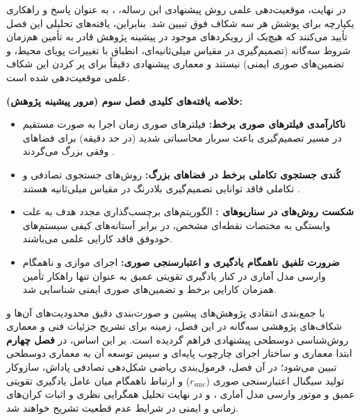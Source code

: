 \documentclass[oneside,openany,phd]{TMU-Thesis}
\begin{document}
در نهایت، موقعیت‌دهی علمی روش پیشنهادی این رساله، ، به عنوان پاسخ و راهکاری یکپارچه برای پوشش هر سه شکاف فوق تبیین شد. بنابراین، یافته‌های تحلیلی این فصل تأیید می‌کنند که هیچ‌یک از رویکردهای موجود در پیشینه پژوهش قادر به تأمین هم‌زمان شروط سه‌گانه (تصمیم‌گیری در مقیاس میلی‌ثانیه‌ای، انطباق با تغییرات پویای محیط، و تضمین‌های صوری ایمنی) نیستند و معماری پیشنهادی  دقیقاً برای پر کردن این شکاف علمی موقعیت‌دهی شده است.

\begin{framed}
\noindent\textbf{خلاصه یافته‌های کلیدی فصل سوم (مرور پیشینه پژوهش):}
\begin{itemize}
    \item \textbf{ناکارآمدی فیلترهای صوری برخط:} فیلترهای صوری زمان اجرا به صورت مستقیم در مسیر تصمیم‌گیری باعث سربار محاسباتی شدید (در حد دقیقه) برای فضاهای وفقی بزرگ می‌گردند \cite{camara2020quantitative, calinescu2011formal}.
    \item \textbf{کُندی جستجوی تکاملی برخط در فضاهای بزرگ:} روش‌های جستجوی تصادفی و تکاملی فاقد توانایی تصمیم‌گیری بلادرنگ در مقیاس میلی‌ثانیه هستند \cite{coker2015sass, kinneer2021information}.
    \item \textbf{شکست روش‌های  در سناریوهای :} الگوریتم‌های برچسب‌گذاری مجدد هدف به علت وابستگی به مختصات نقطه‌ای مشخص، در برابر آستانه‌های کیفی سیستم‌های خودوفق فاقد کارایی علمی می‌باشند.
    \item \textbf{ضرورت تلفیق ناهمگام یادگیری و اعتبارسنجی صوری:} اجرای موازی و ناهمگام وارسی مدل آماری  در کنار یادگیری تقویتی عمیق به عنوان تنها راهکار تأمین همزمان کارایی برخط و تضمین‌های صوری ایمنی شناسایی شد.
\end{itemize}
\end{framed}

با جمع‌بندی انتقادی پژوهش‌های پیشین و صورت‌بندی دقیق محدودیت‌های آن‌ها و شکاف‌های پژوهشی سه‌گانه در این فصل، زمینه برای تشریح جزئیات فنی و معماری روش‌شناسی دوسطحی پیشنهادی فراهم گردیده است. بر این اساس، در \textbf{فصل چهارم} ابتدا معماری و ساختار اجرای چارچوب پایه‌ای  و سپس توسعه آن به معماری دوسطحی \rsdrlplus تبیین می‌شود؛ در آن فصل، فرمول‌بندی ریاضی شکل‌دهی تصادفی پاداش، سازوکار تولید سیگنال اعتبارسنجی صوری ($r_{\text{smc}}$) و ارتباط ناهمگام میان عامل یادگیری تقویتی عمیق و موتور وارسی مدل آماری ، و در نهایت تحلیل همگرایی نظری و اثبات کران‌های زمانی و ایمنی در شرایط عدم قطعیت تشریح خواهند شد.
\newpage




\ifstandalone


\fi
\end{document}
